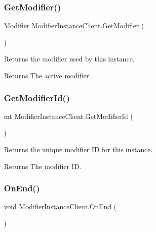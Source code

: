 \subsubsection{\texorpdfstring{Get\+Modifier()}{GetModifier()}}
{\footnotesize\ttfamily \hyperlink{class_modifier}{Modifier} Modifier\+Instance\+Client.\+Get\+Modifier (\begin{DoxyParamCaption}{ }\end{DoxyParamCaption})}



Returns the modifier used by this instance. 

\begin{DoxyReturn}{Returns}
The active modifier.
\end{DoxyReturn}
\hypertarget{class_modifier_instance_client_ae6f8817f0de275a92204d1595d26e731}{}\label{class_modifier_instance_client_ae6f8817f0de275a92204d1595d26e731} 
\subsubsection{\texorpdfstring{Get\+Modifier\+Id()}{GetModifierId()}}
{\footnotesize\ttfamily int Modifier\+Instance\+Client.\+Get\+Modifier\+Id (\begin{DoxyParamCaption}{ }\end{DoxyParamCaption})}



Returns the unique modifier ID for this instance. 

\begin{DoxyReturn}{Returns}
The modifier ID.
\end{DoxyReturn}
\hypertarget{class_modifier_instance_client_a07c777977dc78d7a0ec1d3519b76d5f6}{}\label{class_modifier_instance_client_a07c777977dc78d7a0ec1d3519b76d5f6} 
\subsubsection{\texorpdfstring{On\+End()}{OnEnd()}}
{\footnotesize\ttfamily void Modifier\+Instance\+Client.\+On\+End (\begin{DoxyParamCaption}{ }\end{DoxyParamCaption})}



